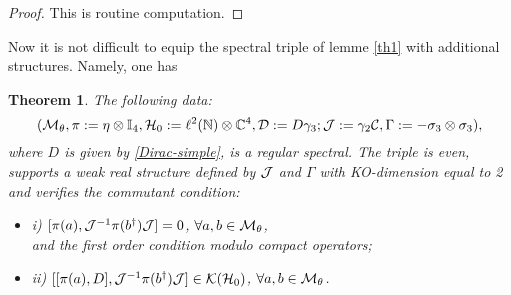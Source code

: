 \documentclass[a4paper,11pt,twoside]{article}
\numberwithin{equation}{section}
\newcommand\bbone{{ \mathbb{I}}}
\newtheorem{theorem}[Theorem]{Theorem}
\theoremstyle{nonumberplain}
\newtheorem{proof}{Proof}
\begin{document}
\begin{proof}
This is routine computation.
\end{proof}
Now it is not difficult to equip the spectral triple of lemme \ref{th1} with additional structures. Namely, one has
\begin{theorem}\label{th2}
The following data:
 \begin{equation}
({\cal{M}}_\theta,\pi:=\eta\otimes\bbone_4,{\cal{H}}_0:=\ell^2(\mathbb{N})\otimes\mathbb{C}^4,{\cal{D}}:=D\gamma_3;{\cal{J}}:=\gamma_2{\cal{C}},\Gamma:=-\sigma_3\otimes\sigma_3),\label{ncg-fluctuat}
\end{equation}
where $D$ is given by \eqref{Dirac-simple}, is a regular spectral. The triple is even, supports a weak real structure defined by ${\cal{J}}$ and $\Gamma$ with KO-dimension equal to 2 and verifies the commutant condition:
\begin{itemize}
\vspace*{-4pt}
\setlength{\itemsep}{-1pt}
\item i) $[\pi(a),{\cal{J}}^{-1}\pi(b^\dag){\cal{J}}]=0$, $\forall a,b\in{\cal{M}}_\theta$,\\
and the first order condition modulo compact operators;
\item ii) $[[\pi(a),D],{\cal{J}}^{-1}\pi(b^\dag){\cal{J}}]\in{\cal{K}}({\cal{H}}_0)$, $\forall a,b\in{\cal{M}}_\theta$.
\end{itemize}
\end{theorem}
\end{document}
